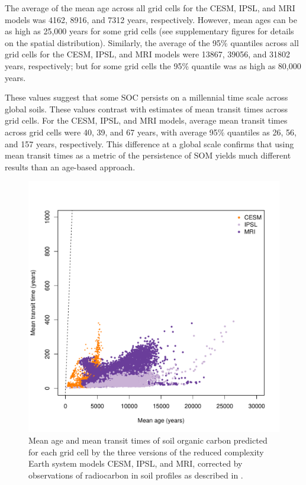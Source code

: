 \documentclass[draft,linenumbers]{agujournal}
\begin{document}
The average of the mean age across all grid cells for the CESM, IPSL, and MRI models was 4162, 8916, and 7312 years, respectively. However, mean ages can be as high as 25,000 years for some grid cells (see supplementary figures for details on the spatial distribution). Similarly, the average of the 95\% quantiles across all grid cells for the CESM, IPSL, and MRI models were 13867, 39056, and 31802 years, respectively; but for some grid cells the 95\% quantile was as high as 80,000 years. 

These values suggest that some SOC persists on a millennial time scale across global soils. These values contrast with estimates of mean transit times across grid cells. For the CESM, IPSL, and MRI models, average mean transit times across grid cells were 40, 39, and 67 years, with average 95\% quantiles as 26,  56, and 157 years, respectively. This difference at a global scale confirms that using mean transit times as a metric of the persistence of SOM yields much different results than an age-based approach.

\begin{figure}[htbp]
   \centering
   \includegraphics[scale=0.8]{Figures/corrsattESMs} %
   \caption{Mean age and mean transit times of soil organic carbon predicted for each grid cell by the three versions of the reduced complexity Earth system models CESM, IPSL, and MRI, corrected by observations of radiocarbon in soil profiles as described in \citet{He2016}.}
   \label{fig:sattESMs}
\end{figure}
\end{document}
